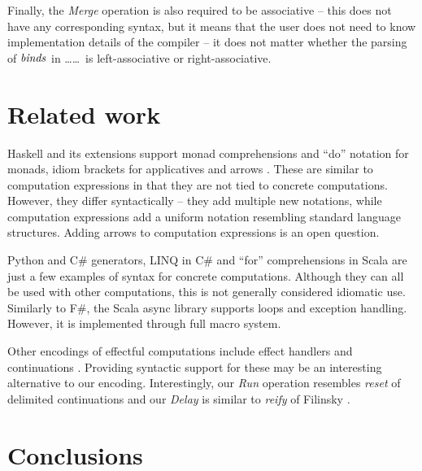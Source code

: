\documentclass[runningheads,a4paper]{llncs}
\begin{document}
Finally, the \emph{Merge} operation is also required to be associative -- this does not have
any corresponding syntax, but it means that the user does not need to know implementation
details of the compiler -- it does not matter whether the parsing of $\textnormal{\emph{binds}}$ in 
\ldots{}\ldots\ is left-associative or right-associative.


\section{Related work}

Haskell and its extensions support monad comprehensions \cite{monad-compose} and ``do'' notation
for monads, idiom brackets \cite{applicative} for applicatives and arrows \cite{arrows}. 
These are similar to computation expressions in that they are not tied to concrete computations. 
However, they differ syntactically -- they add multiple new notations, while computation expressions 
add a uniform notation resembling standard language structures. Adding arrows to
computation expressions is an open question.

Python and C\# generators, LINQ \cite{linq} in C\# and ``for'' comprehensions 
in Scala are just a few examples of syntax for concrete computations. Although they can all be 
used with other computations, this is not generally considered idiomatic use. Similarly to F\#, 
the Scala async library \cite{scala-async} supports loops and exception handling. However, it is
implemented through full macro system.

Other encodings of effectful computations include effect handlers
\cite{effect-handlers} and continuations \cite{monads-layered}. Providing syntactic support for
these may be an interesting alternative to our encoding.
Interestingly, our \emph{Run} operation resembles \emph{reset} of delimited continuations
\cite{delimcont} and  our \emph{Delay} is similar to \emph{reify} of Filinsky 
\cite{monads-inaction}.




\section{Conclusions}
\label{sec:conclusions}
 
\end{document}
